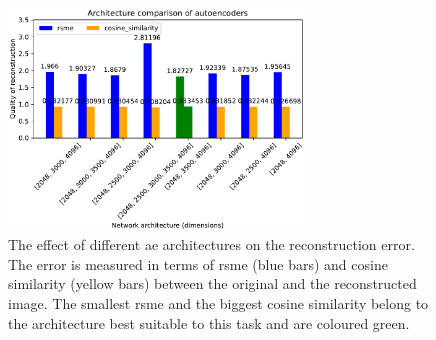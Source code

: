 \begin{figure}[h] %
    \centering
    \includegraphics[width=0.7\textwidth]{images/embeddings/autoencoder/ae_score_plot.pdf}
    \caption{The effect of different \ac{ae} architectures on the reconstruction error.
    The error is measured in terms of \ac{rsme} (blue bars) and cosine similarity (yellow bars) between the original and the reconstructed image.
    The smallest \ac{rsme} and the biggest cosine similarity belong to the architecture best suitable to this task and are coloured green.
    }
    \label{fig:eval-ae-architecture}
\end{figure}